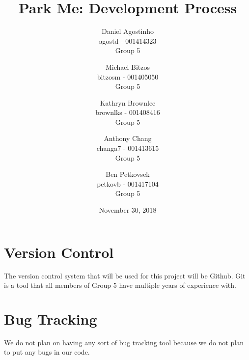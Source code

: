 \documentclass[]{article}
\title{Park Me: Development Process}
\author{Daniel Agostinho\\agostd - 001414323\\ Group 5 \and Michael Bitzos\\bitzosm - 001405050\\ Group 5 \and Kathryn Brownlee\\brownlks - 001408416\\ Group 5  \and Anthony Chang\\changa7 - 001413615\\ Group 5 \and Ben Petkovsek\\petkovb - 001417104\\ Group 5}
\begin{document}
\date{November 30, 2018}
\maketitle
\newpage

\section{Version Control}
The version control system that will be used for this project will be Github. Git is a tool that all members of Group 5 have multiple years of experience with.

\section{Bug Tracking}
We do not plan on having any sort of bug tracking tool because we do not plan to put any bugs in our code.
\end{document}
